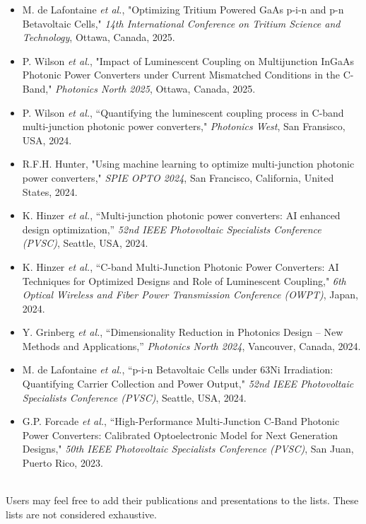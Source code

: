\documentclass[a4paper,12pt,english]{article}
\begin{document}
     \begin{itemize}
        \item M. de Lafontaine \textit{et al.}, "Optimizing Tritium Powered GaAs p-i-n and p-n Betavoltaic Cells," \textit{14th International Conference on Tritium Science and Technology}, Ottawa, Canada, 2025.
        \item P. Wilson \textit{et al.}, "Impact of Luminescent Coupling on Multijunction InGaAs Photonic Power Converters under Current Mismatched Conditions in the C-Band," \textit{Photonics North 2025}, Ottawa, Canada, 2025. 
         \item P. Wilson \textit{et al.}, “Quantifying the luminescent coupling process in C-band multi-junction photonic power converters," \textit{Photonics West}, San Fransisco, USA, 2024. 
         \item R.F.H. Hunter, "Using machine learning to optimize multi-junction photonic power converters," \textit{SPIE OPTO 2024}, San Francisco, California, United States, 2024.
         \item K. Hinzer \textit{et al.}, “Multi-junction photonic power converters: AI enhanced design optimization,” \textit{52nd IEEE Photovoltaic Specialists Conference (PVSC)}, Seattle, USA, 2024. 
         \item K. Hinzer \textit{et al.}, “C-band Multi-Junction Photonic Power Converters: AI Techniques for Optimized Designs and Role of Luminescent Coupling," \textit{6th Optical Wireless and Fiber Power Transmission Conference (OWPT)}, Japan, 2024. 
         \item Y. Grinberg \textit{et al.}, “Dimensionality Reduction in Photonics Design – New Methods and Applications,” \textit{Photonics North 2024}, Vancouver, Canada, 2024.
        \item M. de Lafontaine \textit{et al.}, “p-i-n Betavoltaic Cells under 63Ni Irradiation: Quantifying Carrier Collection and Power Output," \textit{52nd IEEE Photovoltaic Specialists Conference (PVSC)}, Seattle, USA, 2024.
        \item G.P. Forcade \textit{et al.}, “High-Performance Multi-Junction C-Band Photonic Power Converters: Calibrated Optoelectronic Model for Next Generation Designs," \textit{50th IEEE Photovoltaic Specialists Conference (PVSC)}, San Juan, Puerto Rico, 2023.
        
     \end{itemize}\\
    
    \noindent
     Users may feel free to add their publications and presentations to the lists. These lists are not considered exhaustive.  \\
\end{document}
